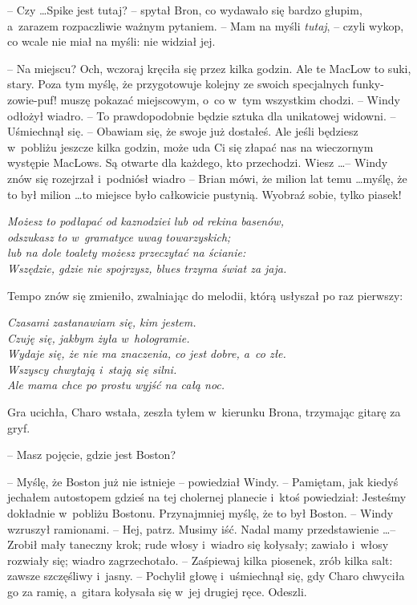 \documentclass[oneside,polish,11pt,rmheadings]{mwbk}
\begin{document}
-- Czy \ldots  Spike jest tutaj? -- spytał Bron, co wydawało się bardzo głupim, a~zarazem rozpaczliwie ważnym pytaniem. -- Mam na myśli \textit{tutaj}, -- czyli wykop, co wcale nie miał na myśli: nie widział jej. 

-- Na miejscu? Och, wczoraj kręciła się przez kilka godzin. Ale te MacLow to suki, stary. Poza tym myślę, że przygotowuje kolejny ze swoich specjalnych funky-zowie-puf! muszę pokazać miejscowym, o~co w~tym wszystkim chodzi. -- Windy odłożył wiadro.  -- To prawdopodobnie będzie sztuka dla unikatowej widowni. -- Uśmiechnął się.  -- Obawiam się, że swoje już dostałeś. Ale jeśli będziesz w~pobliżu jeszcze kilka godzin, może uda Ci się złapać nas na wieczornym występie MacLows. Są otwarte dla każdego, kto przechodzi. Wiesz \ldots  -- Windy znów się rozejrzał i~podniósł wiadro -- Brian mówi, że milion lat temu \ldots  myślę, że to był milion \ldots  to miejsce było całkowicie pustynią. Wyobraź sobie, tylko piasek! 

\noindent \textit{Możesz to podłapać od kaznodziei lub od rekina basenów, \\ odszukasz to w~gramatyce uwag towarzyskich; \\ lub na dole toalety możesz przeczytać na ścianie: \\
Wszędzie, gdzie nie spojrzysz, blues trzyma świat za jaja. }

Tempo znów się zmieniło, zwalniając do melodii, którą usłyszał po raz pierwszy: 

\noindent \textit{Czasami zastanawiam się, kim jestem. \\
Czuję się, jakbym żyła w~hologramie. \\
Wydaje się, że nie ma znaczenia, co jest dobre, a~co złe. \\
Wszyscy chwytają i~stają się silni. \\
 Ale mama chce po prostu wyjść na całą noc. }

Gra ucichła, Charo wstała, zeszła tyłem w~kierunku Brona, trzymając gitarę za gryf.

 -- Masz pojęcie, gdzie jest Boston? 

-- Myślę, że Boston już nie istnieje -- powiedział Windy. -- Pamiętam, jak kiedyś jechałem autostopem gdzieś na tej cholernej planecie i~ktoś powiedział: Jesteśmy dokładnie w~pobliżu Bostonu. Przynajmniej myślę, że to był Boston. -- Windy wzruszył ramionami. -- Hej, patrz.  Musimy iść. Nadal mamy przedstawienie  \ldots  -- Zrobił mały taneczny krok; rude włosy i~wiadro się kołysały; zawiało i~włosy rozwiały się; wiadro zagrzechotało. -- Zaśpiewaj kilka piosenek, zrób kilka salt: zawsze szczęśliwy i~jasny. -- Pochylił głowę i~uśmiechnął się, gdy Charo chwyciła go za ramię, a~gitara kołysała się w~jej drugiej ręce. Odeszli. 
\end{document}
